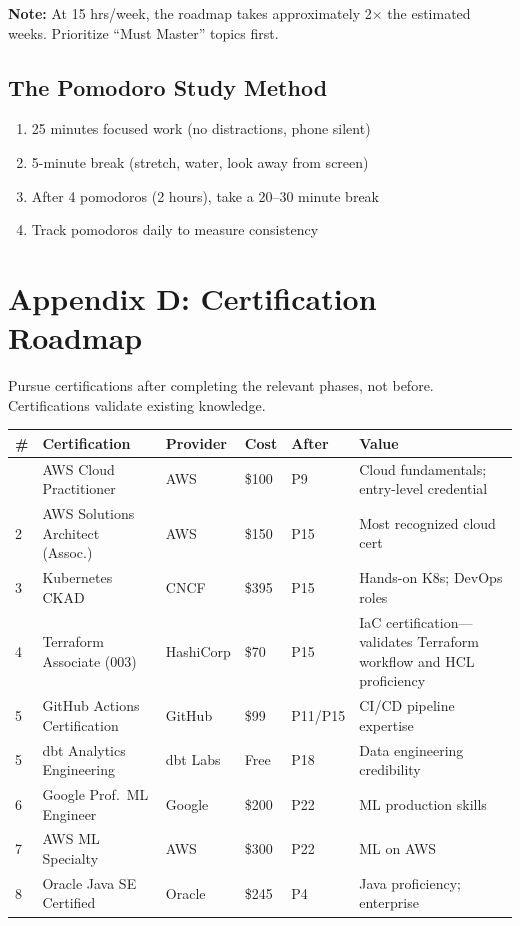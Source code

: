 \documentclass[11pt, a4paper, oneside]{report}
\begin{document}
{{{{{{{\textbf{Note:} At 15 hrs/week, the roadmap takes approximately 2$\times$ the estimated weeks. Prioritize ``Must Master'' topics first.

\section[Pomodoro Method]{The Pomodoro Study Method}

\begin{enumerate}[leftmargin=*]
\item 25 minutes focused work (no distractions, phone silent)
\item 5-minute break (stretch, water, look away from screen)
\item After 4 pomodoros (2 hours), take a 20--30 minute break
\item Track pomodoros daily to measure consistency
\end{enumerate}

\clearpage
\chapter[Certification Roadmap]{Appendix D: Certification Roadmap}

Pursue certifications after completing the relevant phases, not before. Certifications validate existing knowledge.

{\small
{}
\begin{longtable}{L{0.04\textwidth} L{0.24\textwidth} L{0.12\textwidth} L{0.08\textwidth} L{0.10\textwidth} L{0.32\textwidth}}
\toprule
\textbf{\#} & \textbf{Certification} & \textbf{Provider} & \textbf{Cost} & \textbf{After} & \textbf{Value} \\
\midrule
\endfirsthead
\bottomrule
{} & AWS Cloud Practitioner & AWS & \$100 & P9 & Cloud fundamentals; entry-level credential \\
2 & AWS Solutions Architect (Assoc.) & AWS & \$150 & P15 & Most recognized cloud cert \\
3 & Kubernetes CKAD & CNCF & \$395 & P15 & Hands-on K8s; DevOps roles \\
4 & Terraform Associate (003) & HashiCorp & \$70 & P15 & IaC certification---validates Terraform workflow and HCL proficiency \\
5 & GitHub Actions Certification & GitHub & \$99 & P11/P15 & CI/CD pipeline expertise \\
5 & dbt Analytics Engineering & dbt Labs & Free & P18 & Data engineering credibility \\
6 & Google Prof.\ ML Engineer & Google & \$200 & P22 & ML production skills \\
7 & AWS ML Specialty & AWS & \$300 & P22 & ML on AWS \\
8 & Oracle Java SE Certified & Oracle & \$245 & P4 & Java proficiency; enterprise \\
\end{longtable}

}}}}}}}}
\end{document}
